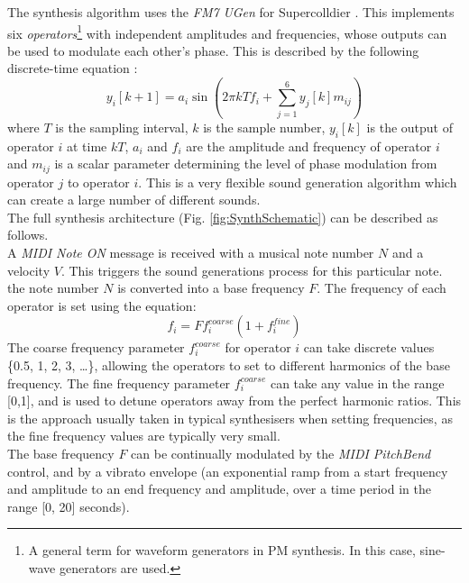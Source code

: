 \documentclass[11pt, oneside]{report}   	%
\begin{document}
The synthesis algorithm uses the \emph{FM7 UGen} for Supercolldier \cite{UGen}. This implements six \emph{operators}\footnote{A general term for waveform generators in PM synthesis. In this case, sine-wave generators are used.} with independent amplitudes and frequencies, whose outputs can be used to modulate each other's phase. This is described by the following discrete-time equation \cite{YeeKing}: 
\begin{equation}
y_i[k+1] = a_i\sin(2\pi kT f_i + \sum_{j = 1}^{6} y_j[k] m_{ij})
\end{equation}
where $T$ is the sampling interval, $k$ is the sample number, $y_i[k]$ is the output of operator $i$ at time $kT$, $a_i$ and $f_i$ are the amplitude and frequency of operator $i$ and $m_{ij}$ is a scalar parameter determining the level of phase modulation from operator $j$ to operator $i$. This is a very flexible sound generation algorithm which can create a large number of different sounds. \\
The full synthesis architecture (Fig. \ref{fig:SynthSchematic}) can be described as follows.\\
 A \emph{MIDI Note ON} message is received with a musical note number $N$ and a velocity $V$. This triggers the sound generations process for this particular note. the note number $N$ is converted into a base frequency $F$. The frequency of each operator is set using the equation: 
 \begin{equation}
	f_i = Ff_i^{coarse}(1+f_i^{fine})
 \end{equation}
The coarse frequency parameter $f_i^{coarse}$ for operator $i$ can take discrete values \{0.5, 1, 2, 3, \dots\}, allowing the operators to set to different harmonics of the base frequency. The fine frequency parameter $f_i^{coarse}$ can take any value in the range [0,1], and is used to detune operators away from the perfect harmonic ratios. This is the approach usually taken in typical synthesisers when setting frequencies, as the fine frequency values are typically very small.\\
The base frequency $F$ can be continually modulated by the \emph{MIDI PitchBend} control, and by a vibrato envelope (an exponential ramp from a start frequency and amplitude to an end frequency and amplitude, over a time period in the range [0, 20] seconds).
\end{document}
